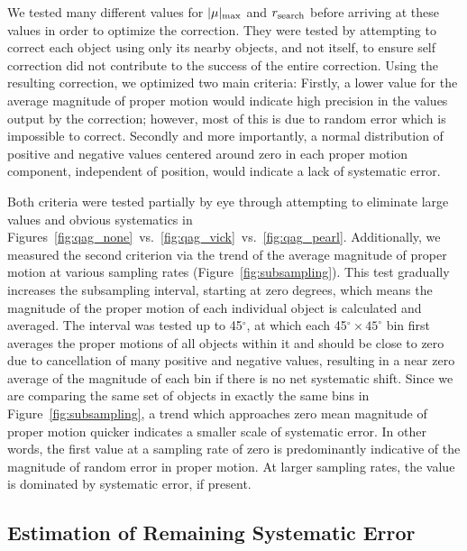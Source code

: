\documentclass[11pt,preprint]{aastex6}
\begin{document}

We tested many different values for $|\mu|_{\rm max}$ and $r_{\rm search}$ before arriving at these values in order to optimize the correction. 
They were tested by attempting to correct each object using only its nearby objects, and not itself, to ensure self correction did not contribute to the success of the entire correction.
Using the resulting correction, we optimized two main criteria:
Firstly, a lower value for the average magnitude of proper motion would indicate high precision in the values output by the correction; however, most of this is due to random error which is impossible to correct.
Secondly and more importantly, a normal distribution of positive and negative values centered around zero in each proper motion component, independent of position, would indicate a lack of systematic error.

Both criteria were tested partially by eye through attempting to eliminate large values and obvious systematics in Figures~\ref{fig:qag_none}~vs.~\ref{fig:qag_vick}~vs.~\ref{fig:qag_pearl}.
Additionally, we measured the second criterion via the trend of the average magnitude of proper motion at various sampling rates (Figure~\ref{fig:subsampling}).
This test gradually increases the subsampling interval, starting at zero degrees, which means the magnitude of the proper motion of each individual object is calculated and averaged.
The interval was tested up to 45$^{\circ}$, at which each 45$^{\circ}\times45^{\circ}$ bin first averages the proper motions of all objects within it and should be close to zero due to cancellation of many positive and negative values, resulting in a near zero average of the magnitude of each bin if there is no net systematic shift.
Since we are comparing the same set of objects in exactly the same bins in Figure~\ref{fig:subsampling}, a trend which approaches zero mean magnitude of proper motion quicker indicates a smaller scale of systematic error.
In other words, the first value at a sampling rate of zero is predominantly indicative of the magnitude of random error in proper motion.
At larger sampling rates, the value is dominated by systematic error, if present.


\subsection{Estimation of Remaining Systematic Error} \label{sec:calc_se}
\end{document}

